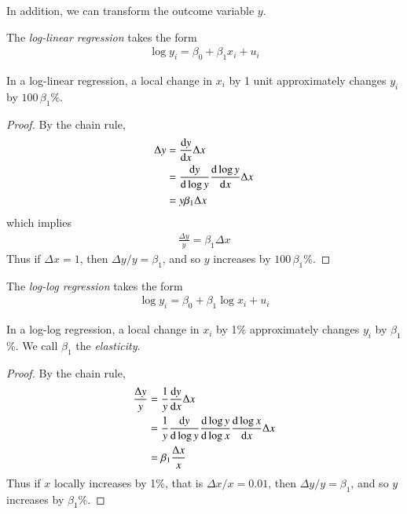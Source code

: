             In addition, we can transform the outcome variable $y$.
            \begin{definition}
                The \textit{log-linear regression} takes the form
                \begin{align}
                    \log y_i = \beta_0 + \beta_1 x_i + u_i
                \end{align}
            \end{definition}
            \begin{lemma}
                In a log-linear regression, a local change in $x_i$ by 1 unit approximately changes $y_i$ by $100\,\beta_1$\%.
            \end{lemma}
            \begin{proof}
                By the chain rule, 
                \begin{align*}
                    \Delta y
                        &= \odv{y}{x}\Delta x \\
                        &= \odv{y}{\log y}\odv{\log y}{x}\Delta x\\  
                        &= y\beta_1\Delta x    
                \end{align*}
                which implies
                \begin{align}
                    \frac{\Delta y}{y} = \beta_1\Delta x
                \end{align}
                Thus if $\Delta x = 1$, then $\Delta y/y = \beta_1$, and so $y$ increases by $100\,\beta_1$\%.
            \end{proof}

            
            \begin{definition}
                The \textit{log-log regression} takes the form
                \begin{align}
                    \log y_i = \beta_0 + \beta_1 \log x_i + u_i
                \end{align}
            \end{definition}
            \begin{lemma}
                In a log-log regression, a local change in $x_i$ by 1\% approximately changes $y_i$ by $\beta_1$\%. We call $\beta_1$ the \textit{elasticity}.
            \end{lemma}
            \begin{proof}
                By the chain rule, 
                \begin{align*}
                    \frac{\Delta y}{y}
                        &= \frac{1}{y}\odv{y}{x}\Delta x \\
                        &= \frac{1}{y}\odv{y}{\log y}\odv{\log y}{\log x}\odv{\log x}{x}\Delta x    \\
                        &= \beta_1 \frac{\Delta x}{x}
                \end{align*}
                Thus if $x$ locally increases by 1\%, that is $\Delta x/x = 0.01$, then $\Delta y/y = \beta_1$, and so $y$ increases by $\beta_1$\%.
            \end{proof}


